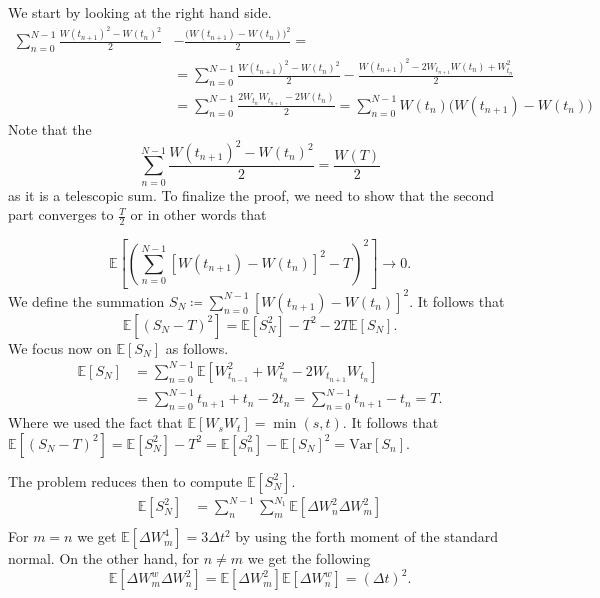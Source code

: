 \documentclass[a4paper,12pt]{article} %
\newcommand{\Var}{\mathrm{Var}}
\begin{document}
We start by looking at the right hand side.
\begin{align*}
    \sum_{n=0}^{N-1} \frac{W(t_{n+1})^2 - W(t_n)^2}{2}
     & - \frac{\big( W(t_{n+1}) - W(t_n) \big)^2}{2}  =                                                                         \\
     & =  \sum_{n=0}^{N-1} \frac{W(t_{n+1})^2 - W(t_n)^2}{2} - \frac{W(t_{n+1})^{2}  - 2W_{t_{n+1}} W(t_n)  + W_{t_n}^{2} }{2}  \\
     & = \sum_{n=0}^{N-1} \frac{2W_{t_n}W_{t_{n+1} } - 2 W(t_n)}{2}  =  \sum_{n=0}^{N-1} W(t_n) \big( W(t_{n+1}) - W(t_n) \big)
\end{align*}
Note that the
\begin{equation}
    \sum_{n=0}^{N-1} \frac{W(t_{n+1})^2 - W(t_n)^2}{2}  = \frac{W(T)}{2}
\end{equation}
as it is a telescopic sum. To finalize the proof, we need to show that the second part converges to \(\frac{T}{2}\) or in other words that

\begin{equation}
    \mathbb{E} \left[ \left( \sum_{n=0}^{N-1} \left[ W(t_{n+1}) - W(t_n) \right]^2 - T \right)^{2}   \right] \to 0.
\end{equation}
We define the summation \(S_N\coloneqq  \sum_{n=0}^{N-1} \left[ W(t_{n+1}) - W(t_n) \right]^2 \).
It follows that
\begin{equation}
    \mathbb{E} \left[ (S_N - T)^2 \right]  = \mathbb{E} \left[ S_N ^2 \right] - T^2 -2 T\mathbb{E} \left[ S_N  \right].
\end{equation}
We focus now on \(\mathbb{E} \left[ S_N \right]\) as follows.
\begin{align*}
    \mathbb{E} \left[ S_N \right] &
    = \sum_{n=0}^{N-1} \mathbb{E} \left[ W_{t_{n-1} }^{2}+W_{t_n}^2 - 2 W_{t_{n+1} }W_{t_n} \right]              \\
                                  & =\sum_{n=0} ^{N-1}  t_{n+1} +t_n -2t_n = \sum_{n=0} ^{N-1} t_{n+1} -t_n = T.
\end{align*}
Where we used the fact that \(\mathbb{E} \left[ W_s W_t \right] = \min(s,t)\).
It follows that \(\mathbb{E} \left[ (S_N-T)^2 \right]= \mathbb{E} \left[ S_N^2 \right] -T^2 = \mathbb{E} \left[ S_n^2 \right]-\mathbb{E} \left[ S_N \right]^2= \Var \left[S_n \right] \).

The problem reduces then to compute \(\mathbb{E} \left[ S_N^2 \right]\).
\begin{align*}
    \mathbb{E} \left[ S_N^2 \right] & = \sum_{n}^{N-1}\sum_{m}^{N_1}\mathbb{E} \left[ \Delta W_n^2 \Delta W_m^2\right] \\
\end{align*}
For \(m=n \)  we get \(\mathbb{E} \left[ \Delta W_m^4  \right]= 3\Delta t^2\) by using the forth moment of the standard normal.
On the other hand, for \(n\neq m\) we get the following
\begin{equation}
    \mathbb{E} \left[ \Delta W_m^w \Delta  W_n^2 \right] = \mathbb{E} \left[ \Delta  W_m ^2\right] \mathbb{E} \left[ \Delta  W_n^w \right] =  (\Delta t)^2.
\end{equation}
\end{document}
